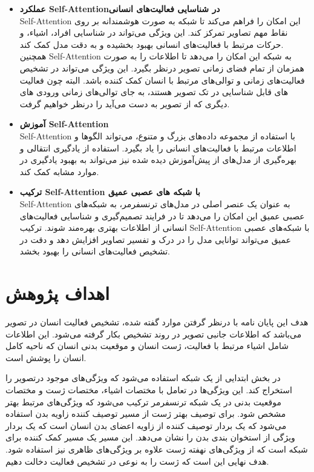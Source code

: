 \begin{itemize}
	\item \textbf{عملکرد \gls{Self-Attention}در شناسایی فعالیت‌های انسانی}\\
\gls{Self-Attention}
 این امکان را فراهم می‌کند تا شبکه به صورت هوشمندانه بر روی نقاط مهم تصاویر تمرکز کند. این ویژگی می‌تواند در شناسایی افراد، اشیاء، و حرکات مرتبط با فعالیت‌های انسانی بهبود بخشیده و به دقت مدل کمک کند.\\
 همچنین %
\gls{Self-Attention}
  به شبکه این امکان را می‌دهد تا اطلاعات را به صورت همزمان از تمام فضای زمانی تصویر درنظر بگیرد. این ویژگی می‌تواند در تشخیص فعالیت‌های زمانی و توالی‌های مرتبط با انسان کمک کننده باشد. البته چون فعالیت های قابل شناسایی در تک تصویر هستند، به جای توالی‌های زمانی ورودی های دیگری که از تصویر به دست می‌آید را درنظر خواهیم گرفت.
  	\item \textbf{آموزش \gls{Self-Attention}}\\
	\gls{Self-Attention}
  با استفاده از مجموعه داده‌های بزرگ و متنوع، می‌تواند الگوها و اطلاعات مرتبط با فعالیت‌های انسانی را یاد بگیرد. استفاده از یادگیری انتقالی و بهره‌گیری از مدل‌های از پیش‌آموزش دیده شده نیز می‌تواند به بهبود یادگیری در موارد مشابه کمک کند.
    	\item \textbf{ترکیب \gls{Self-Attention} با شبکه های عصبی عمیق}\\
	\gls{Self-Attention}
 به عنوان یک عنصر اصلی در مدل‌های ترنسفرمر، به شبکه‌های عصبی عمیق این امکان را می‌دهد تا در فرایند تصمیم‌گیری و شناسایی فعالیت‌های انسانی از اطلاعات بهتری بهره‌مند شوند.
 ترکیب %
   \gls{Self-Attention}
  با شبکه‌های عصبی عمیق می‌تواند توانایی مدل را در درک و تفسیر تصاویر افزایش دهد و دقت در تشخیص فعالیت‌های انسانی را بهبود بخشد.
\end{itemize}
\section{اهداف پژوهش}
هدف این پایان نامه با درنظر گرفتن موارد گفته شده، تشخیص فعالیت انسان در تصویر می‌باشد که اطلاعات جانبی تصویر در روند تشخیص بکار گرفته می‌شود. این اطلاعات شامل اشیاء مرتبط با فعالیت، ژست انسان و موقعیت بدنی انسان که ناحیه کامل انسان را پوشش است.

در بخش ابتدایی از یک شبکه استفاده می‌شود که ویژگی‌های موجود درتصویر را استخراج کند. این ویژگی‌ها در تعامل با مختصات اشیاء، مختصات ژست و مختصات موقعیت بدنی در یک شبکه ترنسفرمر ترکیب می‌شود که ویژگی‌های مرتبط بهتر مشخص شود. برای توصیف بهتر ژست از مسیر توصیف کننده زاویه بدن استفاده می‌شود که یک بردار توصیف کننده از زاویه اعضای بدن انسان است که یک بردار ویژگی از استخوان بندی بدن را نشان می‌دهد. این مسیر یک مسیر کمک کننده برای شبکه است که از ویژگی‌های نهفته ژست علاوه بر ویژگی‌های ظاهری نیز استفاده شود. هدف نهایی این است که ژست را به نوعی در تشخیص فعالیت دخالت دهیم.

